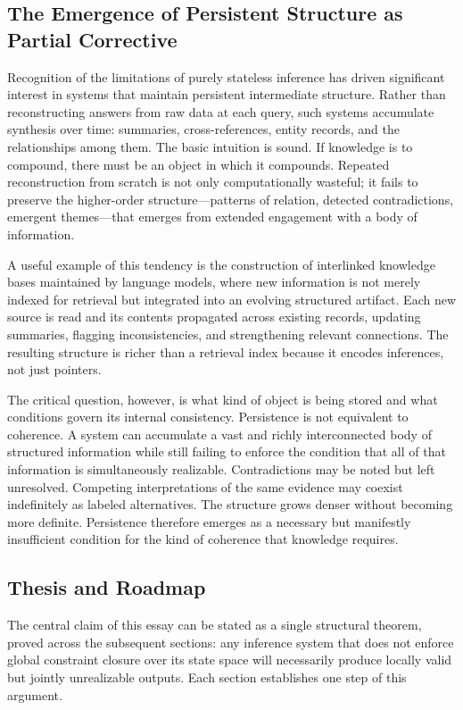 \documentclass[12pt, oneside]{article}
\begin{document}
\subsection{The Emergence of Persistent Structure as Partial Corrective}

Recognition of the limitations of purely stateless inference has driven significant interest in systems that maintain persistent intermediate structure. Rather than reconstructing answers from raw data at each query, such systems accumulate synthesis over time: summaries, cross-references, entity records, and the relationships among them. The basic intuition is sound. If knowledge is to compound, there must be an object in which it compounds. Repeated reconstruction from scratch is not only computationally wasteful; it fails to preserve the higher-order structure---patterns of relation, detected contradictions, emergent themes---that emerges from extended engagement with a body of information.

A useful example of this tendency is the construction of interlinked knowledge bases maintained by language models, where new information is not merely indexed for retrieval but integrated into an evolving structured artifact. Each new source is read and its contents propagated across existing records, updating summaries, flagging inconsistencies, and strengthening relevant connections. The resulting structure is richer than a retrieval index because it encodes inferences, not just pointers.

The critical question, however, is what kind of object is being stored and what conditions govern its internal consistency. Persistence is not equivalent to coherence. A system can accumulate a vast and richly interconnected body of structured information while still failing to enforce the condition that all of that information is simultaneously realizable. Contradictions may be noted but left unresolved. Competing interpretations of the same evidence may coexist indefinitely as labeled alternatives. The structure grows denser without becoming more definite. Persistence therefore emerges as a necessary but manifestly insufficient condition for the kind of coherence that knowledge requires.

\subsection{Thesis and Roadmap}

The central claim of this essay can be stated as a single structural theorem, proved across the subsequent sections: any inference system that does not enforce global constraint closure over its state space will necessarily produce locally valid but jointly unrealizable outputs. Each section establishes one step of this argument.
\end{document}
